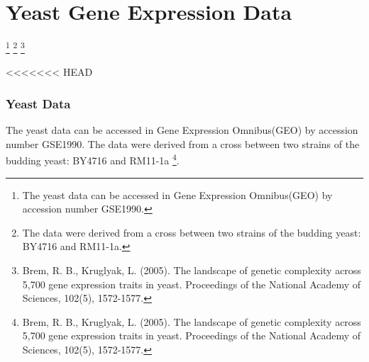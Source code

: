 \section{Yeast Gene Expression Data}
\begin{frame}
    \sectionpage 
    \footnote[1]{The yeast data can be accessed in Gene Expression Omnibus(GEO) by accession number GSE1990.}
    \footnote[2]{The data were derived from a cross between two strains of the budding yeast: BY4716 and RM11-1a.}
    \footnote[3]{Brem, R. B., Kruglyak, L. (2005). The landscape of genetic complexity across 5,700 gene expression traits in yeast. Proceedings of the National Academy of Sciences, 102(5), 1572-1577.}
\end{frame}

<<<<<<< HEAD
\begin{frame}\frametitle{Yeast Data}
    The yeast data can be accessed in Gene Expression Omnibus(GEO) by accession number GSE1990. 
    The data were derived from a cross between two strains of the budding yeast: BY4716 and RM11-1a \footnote[1]{Brem, R. B., Kruglyak, L. (2005). The landscape of genetic complexity across 5,700 gene expression traits in yeast. Proceedings of the National Academy of Sciences, 102(5), 1572-1577.}. 


\end{frame}

%


